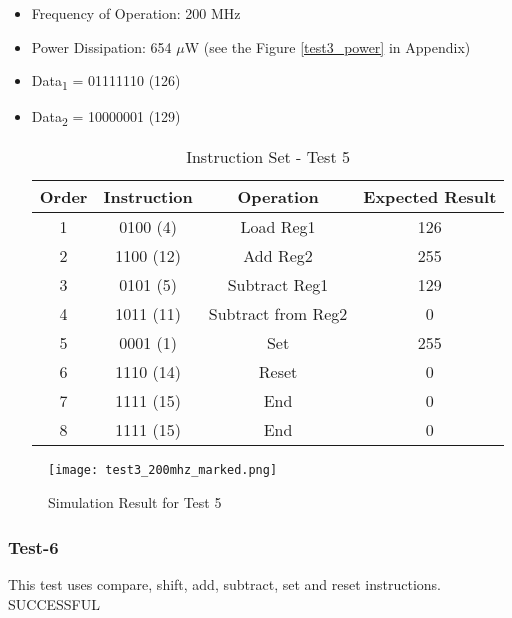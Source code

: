 \documentclass[12pt]{article}
\begin{document}
\begin{itemize}
\item Frequency of Operation: 200 MHz
\item Power Dissipation: 654 $\mu$W (see the Figure \ref{test3_power} in Appendix)
\item Data\textsubscript{1} = 01111110 (126) 
\item Data\textsubscript{2} = 10000001 (129) 
\begin{table}[h]
\centering
\begin{tabular}{|c|c|c|c|}
\hline 
Order & Instruction & Operation & Expected Result \\ 
\hline 
1 & 0100 (4) & Load Reg1 & 126 \\ 
\hline 
2 & 1100 (12) & Add Reg2 & 255 \\ 
\hline 
3 & 0101 (5) & Subtract Reg1 & 129 \\ 
\hline 
4 & 1011 (11) & Subtract from Reg2 & 0 \\ 
\hline 
5 & 0001 (1) & Set & 255 \\ 
\hline 
6 & 1110 (14) & Reset & 0 \\ 
\hline 
7 & 1111 (15) & End & 0 \\ 
\hline 
8 & 1111 (15) & End & 0 \\ 
\hline 
\end{tabular} 
\caption{Instruction Set - Test 5}
\end{table}
\end{itemize}


\begin{figure}[H]
\centering
\texttt{[image: test3\_200mhz\_marked.png]}
\caption{Simulation Result for Test 5}
\label{test5}
\end{figure}



\subsubsection*{Test-6} %
This test uses compare, shift, add, subtract, set and reset instructions.\color{Green} SUCCESSFUL \color{Black}
\end{document}
